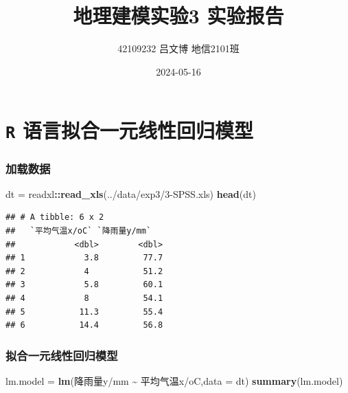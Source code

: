 \documentclass[
]{article}
\title{地理建模实验3 实验报告}
\author{42109232 \quad 吕文博 \quad 地信2101班}
\date{2024-05-16}
\newenvironment{Shaded}{\begin{snugshade}}{\end{snugshade}}
\newcommand{\AttributeTok}[1]{\textcolor[rgb]{0.13,0.29,0.53}{#1}}
\newcommand{\FunctionTok}[1]{\textcolor[rgb]{0.13,0.29,0.53}{\textbf{#1}}}
\newcommand{\NormalTok}[1]{#1}
\newcommand{\OtherTok}[1]{\textcolor[rgb]{0.56,0.35,0.01}{#1}}
\newcommand{\SpecialCharTok}[1]{\textcolor[rgb]{0.81,0.36,0.00}{\textbf{#1}}}
\newcommand{\StringTok}[1]{\textcolor[rgb]{0.31,0.60,0.02}{#1}}
\begin{document}
\maketitle

\section{\texorpdfstring{\texttt{R}
语言拟合一元线性回归模型}{R 语言拟合一元线性回归模型}}\label{r-ux8bedux8a00ux62dfux5408ux4e00ux5143ux7ebfux6027ux56deux5f52ux6a21ux578b}

\subsubsection{加载数据}\label{ux52a0ux8f7dux6570ux636e}

\begin{Shaded}
\begin{Highlighting}[]
\NormalTok{dt }\OtherTok{=}\NormalTok{ readxl}\SpecialCharTok{::}\FunctionTok{read\_xls}\NormalTok{(}\StringTok{\textquotesingle{}../data/exp3/3{-}SPSS.xls\textquotesingle{}}\NormalTok{)}
\FunctionTok{head}\NormalTok{(dt)}
\end{Highlighting}
\end{Shaded}

\begin{verbatim}
## # A tibble: 6 x 2
##   `平均气温x/oC` `降雨量y/mm`
##            <dbl>        <dbl>
## 1            3.8         77.7
## 2            4           51.2
## 3            5.8         60.1
## 4            8           54.1
## 5           11.3         55.4
## 6           14.4         56.8
\end{verbatim}

\subsubsection{拟合一元线性回归模型}\label{ux62dfux5408ux4e00ux5143ux7ebfux6027ux56deux5f52ux6a21ux578b}

\begin{Shaded}
\begin{Highlighting}[]
\NormalTok{lm.model }\OtherTok{=} \FunctionTok{lm}\NormalTok{(}\StringTok{\textasciigrave{}}\AttributeTok{降雨量y/mm}\StringTok{\textasciigrave{}} \SpecialCharTok{\textasciitilde{}} \StringTok{\textasciigrave{}}\AttributeTok{平均气温x/oC}\StringTok{\textasciigrave{}}\NormalTok{,}\AttributeTok{data =}\NormalTok{ dt)}
\FunctionTok{summary}\NormalTok{(lm.model)}
\end{Highlighting}
\end{Shaded}
\end{document}
